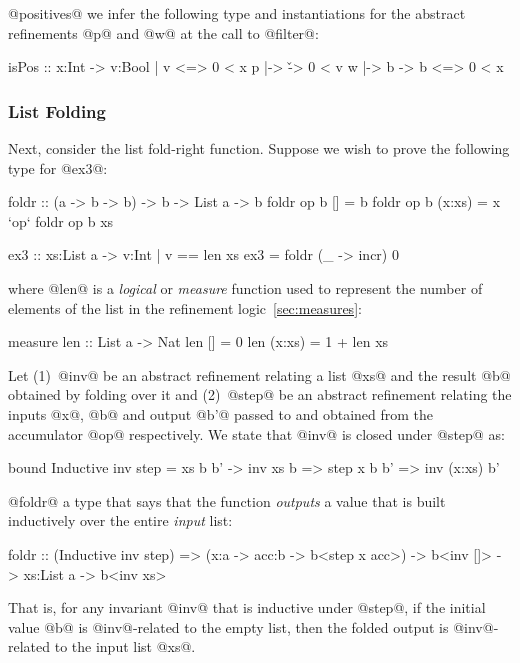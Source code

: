  @positives@ we infer the following type and
instantiations for the abstract refinements @p@ and @w@ at the
call to @filter@:
%
\begin{code}
  isPos :: x:Int -> {v:Bool | v <=> 0 < x}
  p     |-> \v    -> 0 < v
  w     |-> \x b  -> b <=> 0 < x
\end{code}

\subsubsection{List Folding}

Next, consider the list fold-right function. Suppose we
wish to prove the following type for @ex3@:
%
\begin{code}
  foldr :: (a -> b -> b) -> b -> List a -> b
  foldr op b []     = b
  foldr op b (x:xs) = x `op` foldr op b xs

  ex3 :: xs:List a -> {v:Int | v == len xs}
  ex3 = foldr (\_ -> incr) 0
\end{code}
%
where @len@ is a \emph{logical} or \emph{measure}
function used to represent the number of elements of
the list in the refinement logic~\ref{sec:measures}:
%
\begin{code}
  measure len   :: List a -> Nat
    len []      = 0
    len (x:xs)  = 1 + len xs
\end{code}

 Let
(1)~@inv@ be an abstract refinement relating a list @xs@
    and the result @b@ obtained by folding over it and
(2)~@step@ be an abstract refinement relating the
    inputs @x@, @b@ and output @b'@ passed to and
    obtained from the accumulator @op@ respectively.
%
We state that @inv@ is closed under @step@ as:
%
\begin{code}
  bound Inductive inv step = \x xs b b' ->
        inv xs b => step x b b' => inv (x:xs) b'
\end{code}
%

 @foldr@ a type that says that the
function \emph{outputs} a value that is built inductively
over the entire \emph{input} list:
%
\begin{code}
  foldr :: (Inductive inv step)
        => (x:a -> acc:b -> b<step x acc>)
        -> b<inv []>
        -> xs:List a
        -> b<inv xs>
\end{code}
%
That is, for any invariant @inv@ that is inductive
under @step@, if the initial value @b@ is @inv@-related
to the empty list, then the folded output is @inv@-related
to the input list @xs@.

